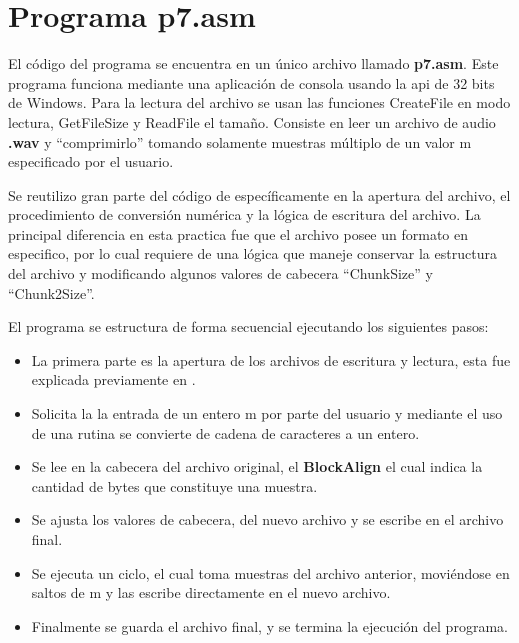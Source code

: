 \section{Programa p7.asm}

El código del programa se encuentra en un único archivo llamado \textbf{p7.asm}.
Este programa funciona mediante una aplicación de consola usando la api de 32
bits de Windows. Para la lectura del archivo se usan las funciones
CreateFile en modo lectura, GetFileSize y ReadFile el tamaño. Consiste en
leer un archivo de audio \textbf{.wav} y ``comprimirlo'' tomando solamente
muestras múltiplo de un valor m especificado por el usuario.

Se reutilizo gran parte del código de \cite{pract6} específicamente
en la apertura del archivo, el procedimiento de conversión numérica y
la lógica de escritura del archivo. La principal diferencia en esta
practica fue que el archivo posee un formato en especifico, por lo
cual requiere de una lógica que maneje conservar la estructura del
archivo y modificando algunos valores de cabecera ``ChunkSize'' y ``Chunk2Size''.


El programa se estructura de forma secuencial ejecutando los siguientes
pasos:

\begin{itemize}

\item{La primera parte es la apertura de los archivos de escritura y lectura, esta
    fue explicada previamente en \cite{pract6}.}

\item{Solicita la la entrada de un entero m por parte del usuario y
    mediante el uso de una rutina se convierte de cadena de caracteres a un entero.}

\item{Se lee en la cabecera del archivo original, el \textbf{BlockAlign} el
    cual indica la cantidad de bytes que constituye una muestra.}

\item{Se ajusta los valores de cabecera, del nuevo archivo y se escribe
    en el archivo final.}

\item{Se ejecuta un ciclo, el cual toma muestras del archivo anterior,
    moviéndose en saltos de m y las escribe directamente en el nuevo archivo.}

\item{Finalmente se guarda el archivo final, y se termina la ejecución del programa.}

\end{itemize}


